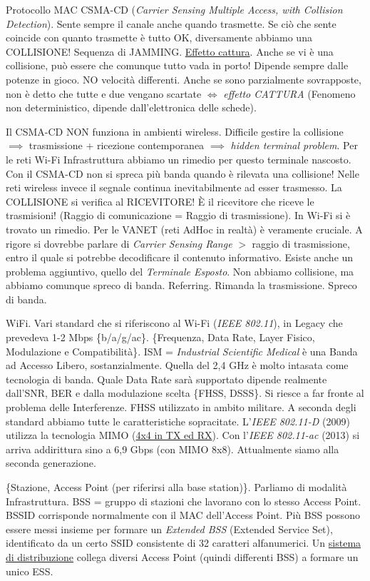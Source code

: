 Protocollo MAC CSMA-CD (\textit{Carrier Sensing Multiple Access, with Collision Detection}). Sente sempre il canale anche quando trasmette. Se ciò che sente coincide con quanto trasmette è tutto OK, diversamente abbiamo una COLLISIONE! Sequenza di JAMMING. \underline{Effetto cattura}. Anche se vi è una collisione, può essere che comunque tutto vada in porto! Dipende sempre dalle potenze in gioco. NO velocità differenti. Anche se sono parzialmente sovrapposte, non è detto che tutte e due vengano scartate $\iff$ \textit{effetto CATTURA} (Fenomeno non deterministico, dipende dall'elettronica delle schede).

Il CSMA-CD NON funziona in ambienti wireless. Difficile gestire la collisione $\implies$ trasmissione + ricezione contemporanea $\implies$ \textit{hidden terminal problem}. Per le reti Wi-Fi Infrastruttura abbiamo un rimedio per questo terminale nascosto. Con il CSMA-CD non si spreca più banda quando è rilevata una collisione! Nelle reti wireless invece il segnale continua inevitabilmente ad esser trasmesso. La COLLISIONE si verifica al RICEVITORE! \`E il ricevitore che riceve le trasmisioni! (Raggio di comunicazione = Raggio di trasmissione). In Wi-Fi si è trovato un rimedio. Per le VANET (reti AdHoc in realtà) è veramente cruciale. A rigore si dovrebbe parlare di \textit{Carrier Sensing Range} $>$ raggio di trasmissione, entro il quale si potrebbe decodificare il contenuto informativo. Esiste anche un problema aggiuntivo, quello del \textit{Terminale Esposto}. Non abbiamo collisione, ma abbiamo comunque spreco di banda. Referring. Rimanda la trasmissione. Spreco di banda.

WiFi. Vari standard che si riferiscono al Wi-Fi (\textit{IEEE 802.11}), in Legacy che prevedeva 1-2 Mbps \{b/a/g/ac\}. \{Frequenza, Data Rate, Layer Fisico, Modulazione e Compatibilità\}. ISM = \textit{Industrial Scientific Medical} è una Banda ad Accesso Libero, sostanzialmente. Quella del 2,4 GHz è molto intasata come tecnologia di banda. Quale Data Rate sarà supportato dipende realmente dall'SNR, BER e dalla modulazione scelta \{FHSS, DSSS\}. Si riesce a far fronte al problema delle Interferenze. FHSS utilizzato in ambito militare. A seconda degli standard abbiamo tutte le caratteristiche sopracitate. L'\textit{IEEE 802.11-D} (2009) utilizza la tecnologia MIMO (\underline{4x4 in TX ed RX}). Con l'\textit{IEEE 802.11-ac} (2013) si arriva addirittura sino a 6,9 Gbps (con MIMO 8x8). Attualmente siamo alla seconda generazione.

\{Stazione, Access Point (per riferirsi alla base station)\}. Parliamo di modalità Infrastruttura. BSS = gruppo di stazioni che lavorano con lo stesso Access Point. BSSID corrisponde normalmente con il MAC dell'Access Point. Più BSS possono essere messi insieme per formare un \textit{Extended BSS} (Extended Service Set), identificato da un certo SSID consistente di 32 caratteri alfanumerici. Un \underline{sistema di distribuzione} collega diversi Access Point (quindi differenti BSS) a formare un unico ESS.

